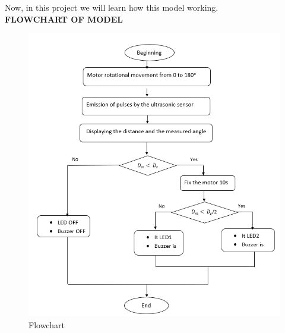\documentclass[a4paper,13pt]{report}
\begin{document}
                    \par Now, in this project we will learn how this model working. \\
                    \vspace{3mm}
                    \Large{\textbf{FLOWCHART OF MODEL}}
                    \begin{figure}[H]
                        \centering
                        \includegraphics[width=\linewidth]{flowchart1.png}
                        \caption{\label{fig:pic}Flowchart}
                    \end{figure}
\end{document}
